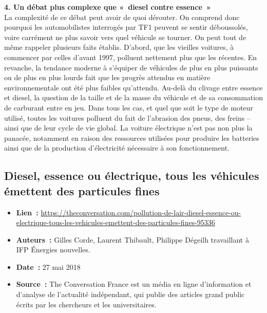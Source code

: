 \documentclass[8pt]{article}
\begin{document}
\textbf{4. Un débat plus complexe que «~diesel contre essence~»}\\

La complexité de ce débat peut avoir de quoi dérouter. On comprend donc pourquoi les automobilistes interrogés par TF1 peuvent se sentir déboussolés, voire carrément ne plus savoir vers quel véhicule se tourner.
On peut tout de même rappeler plusieurs faits établis. D’abord, que les vieilles voitures, à commencer par celles d’avant 1997, polluent nettement plus que les récentes.
En revanche, la tendance moderne à s’équiper de véhicules de plus en plus puissants ou de plus en plus lourds fait que les progrès attendus en matière environnementale ont été plus faibles qu’attendu. Au-delà du clivage entre essence et diesel, la question de la taille et de la masse du véhicule et de sa consommation de carburant entre en jeu.
Dans tous les cas, et quel que soit le type de moteur utilisé, toutes les voitures polluent du fait de l’abrasion des pneus, des freins – ainsi que de leur cycle de vie global. La voiture électrique n’est pas non plus la panacée, notamment en raison des ressources utilisées pour produire les batteries ainsi que de la production d’électricité nécessaire à son fonctionnement.


\newpage
\subsection{Diesel, essence ou électrique, tous les véhicules émettent des particules fines}
\label{sec:conversation_voitures}

\begin{itemize}
	\item \textbf{Lien~: } \url{https://theconversation.com/pollution-de-lair-diesel-essence-ou-electrique-tous-les-vehicules-emettent-des-particules-fines-95336}
	\item \textbf{Auteurs~: } Gilles Corde, Laurent Thibault, Philippe Dégeilh travaillant à IFP Énergies nouvelles.
	\item \textbf{Date~: } 27 mai 2018
	\item \textbf{Source~: } The Conversation France est un média en ligne d'information et d'analyse de l'actualité indépendant, qui publie des articles grand public écrits par les chercheurs et les universitaires. 
\end{itemize}
\end{document}
